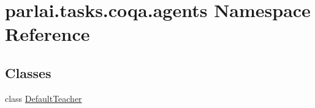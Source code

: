 \hypertarget{namespaceparlai_1_1tasks_1_1coqa_1_1agents}{}\section{parlai.\+tasks.\+coqa.\+agents Namespace Reference}
\label{namespaceparlai_1_1tasks_1_1coqa_1_1agents}
\subsection*{Classes}
\begin{DoxyCompactItemize}
\item 
class \hyperlink{classparlai_1_1tasks_1_1coqa_1_1agents_1_1DefaultTeacher}{Default\+Teacher}
\end{DoxyCompactItemize}
